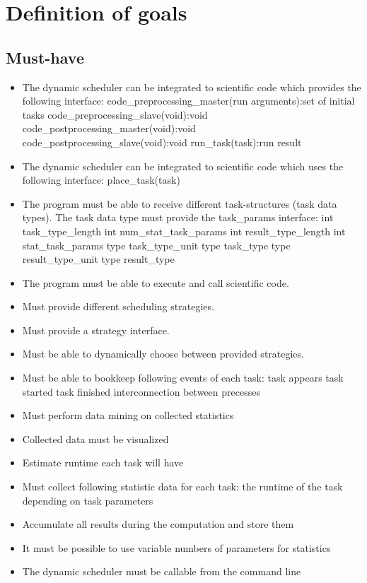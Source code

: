 \section{Definition of goals}
	\subsection{Must-have}
		\begin{itemize}
			\item The dynamic scheduler can be integrated to scientific code which provides the following interface:
				\subitem code\_preprocessing\_master(run arguments):set of initial tasks
				\subitem code\_preprocessing\_slave(void):void
				\subitem code\_postprocessing\_master(void):void
				\subitem code\_postprocessing\_slave(void):void
				\subitem run\_task(task):run result
			\item The dynamic scheduler can be integrated to scientific code which uses the following interface:
				\subitem place\_task(task)
			\item The program must be able to receive different task-structures (task data types). The task data type must provide the task\_params interface:
				\subitem int task\_type\_length
				\subitem int num\_stat\_task\_params
				\subitem int result\_type\_length
				\subitem int stat\_task\_params
				\subitem type task\_type\_unit
				\subitem type task\_type
				\subitem type result\_type\_unit
				\subitem type result\_type
				
			\item The program must be able to execute and call scientific code.%
			\item Must provide different scheduling strategies.
			\item Must provide a strategy interface.
			\item Must be able to dynamically choose between provided strategies.
			\item Must be able to bookkeep following events of each task:
				\subitem task appears
				\subitem task started
				\subitem task finished
				\subitem interconnection between precesses
			\item Must perform data mining on collected statistics
			\item Collected data must be visualized
			\item Estimate runtime each task will have
			\item Must collect following statistic data for each task:
				\subitem the runtime of the task depending on task parameters
			\item Accumulate all results during the computation and store them
			\item It must be possible to use variable numbers of parameters for statistics
			\item The dynamic scheduler must be callable from the command line
		\end{itemize}
